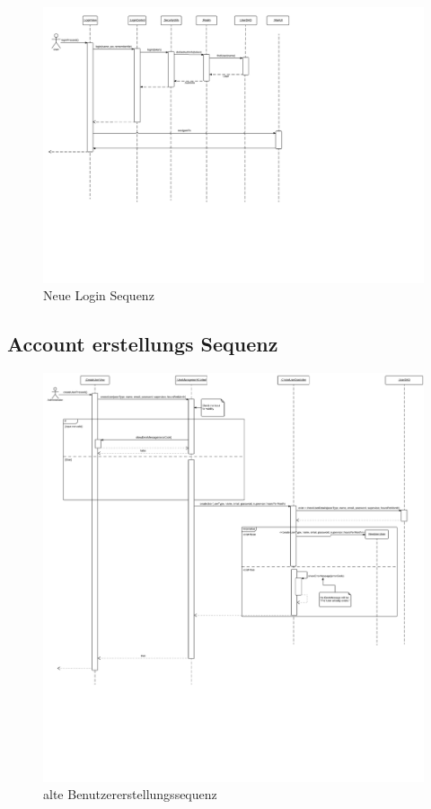     \begin{figure}
      \centering
        \includegraphics[width=\linewidth]{Login-Sequenz-new.svg}
       \caption{Neue Login Sequenz}
    \end{figure}

    \subsection{Account erstellungs Sequenz}

    \begin{figure}
      \centering
        \includegraphics[width=\linewidth]{Create-user-account.svg}
       \caption{alte Benutzererstellungssequenz}
    \end{figure}

